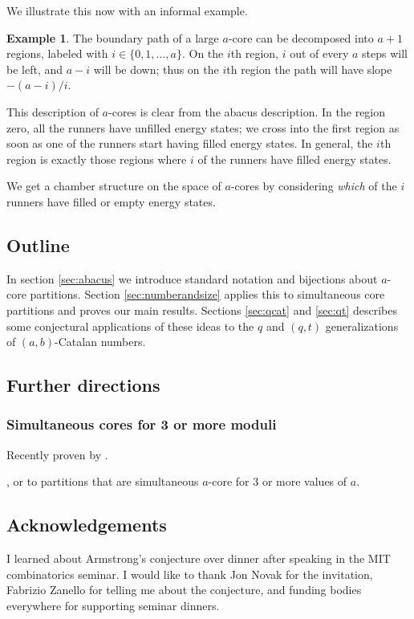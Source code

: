 \documentclass{amsart}[12pt]
\theoremstyle{definition}
\newtheorem{example}[dummy]{Example}
\begin{document}
We illustrate this now with an informal example.
\begin{example}
The boundary path of a large $a$-core can be decomposed into $a+1$ regions, labeled with $i\in\{0,1,\dots,a\}$.  On the $i$th region, $i$ out of every $a$ steps will be left, and $a-i$ will be down; thus on the $i$th region the path will have slope $-(a-i)/i$.  

This description of $a$-cores is clear from the abacus description.  In the region zero, all the runners have unfilled energy states; we cross into the first region as soon as one of the runners start having filled energy states.  In general, the $i$th region is exactly those regions where $i$ of the runners have filled energy states.  

We get a chamber structure on the space of $a$-cores by considering \emph{which} of the $i$ runners have filled or empty energy states.  



\end{example}




\subsection{Outline}
In section \ref{sec:abacus} we introduce standard notation and bijections about $a$-core partitions.  Section \ref{sec:numberandsize} applies this to simultaneous core partitions and proves our main results.  Sections \ref{sec:qcat} and \ref{sec:qt} describes some conjectural applications of these ideas to the $q$ and $(q,t)$ generalizations of $(a,b)$-Catalan numbers.

\subsection{Further directions}





\subsubsection{Simultaneous cores for 3 or more moduli}

Recently proven by \cite{X}.



, or to partitions that are simultaneous $a$-core for 3 or more values of $a$.  
\subsection{Acknowledgements}
I learned about Armstrong's conjecture over dinner after speaking in the MIT combinatorics seminar.  I would like to thank Jon Novak for the invitation, Fabrizio Zanello for telling me about the conjecture, and funding bodies everywhere for supporting seminar dinners.
\end{document}
